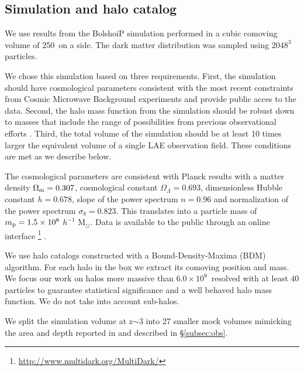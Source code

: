 \documentclass{emulateapj}
\newcommand{\hMpc}{{\ifmmode{h^{-1}{\rm Mpc}}\else{$h^{-1}$Mpc}\fi}}
\newcommand{\hMsun}{{\ifmmode{h^{-1}{\rm {M_{\odot}}}}\else{$h^{-1}{\rm{M_{\odot}}}$}\fi}}
\begin{document}
\subsection{Simulation and halo catalog}
\label{subsec:sim}

We use results from the BolshoiP simulation \citep{Bolshoi,BolshoiP} 
performed in a cubic  comoving volume of 250\hMpc\  on a side. 
The dark matter distribution was sampled using  $2048^{3}$
particles. 

We chose this simulation based on three requirements. 
First, the simulation should have cosmological parameters consistent
with the most recent constraints from Cosmic Microwave Background
experiments and provide public acces to the data.
Second, the halo mass function from the simulation should be robust
down to masses that include the range of possibilities from previous
observational efforts \cite[e.g. results from][impose a lower bound of
  $10^{10}$\hMsun.]{Hayashino2004,Gawiser2007,Ouchi2010,Bielby16} .
Third, the total volume of the simulation should be at least 10 times
larger the equivalent volume of a single LAE observation field.
These conditions are met as we describe below. 

The cosmological parameters are consistent with Planck
results \citep{Planck2014} with a matter density 
$\Omega_{\rm m} = 0.307$, cosmological constant
$\Omega_{\Lambda}=0.693$, dimensionless Hubble constant $h=0.678$, slope
of the power spectrum  $n=0.96$ and normalization of the power
spectrum $\sigma_{8}=0.823$.  
This translates into a particle mass of  $m_{\rm p}=1.5\times 10^{8}$
$h^{-1}$ M$_{\odot}$. 
Data is available to the
public through an online
interface \footnote{\url{http://www.multidark.org/MultiDark/}}
\citep{MultiDark}.    


We use halo catalogs constructed with a Bound-Density-Maxima (BDM)
algorithm. 
For each  halo in the box we extract its comoving position and mass.  
We focus our work on halos more massive than $6.0\times
10^{9}$\hMsun\ resolved with at least  $40$ particles 
to guarantee statistical significance and a well behaved halo mass function. 
We do not take into account sub-halos.

We split the simulation volume at z$\sim$3 into  27 smaller mock
volumes mimicking the  area and depth reported in \citet{Bielby16} and
described in \S \ref{subsec:obs}.   
\end{document}
